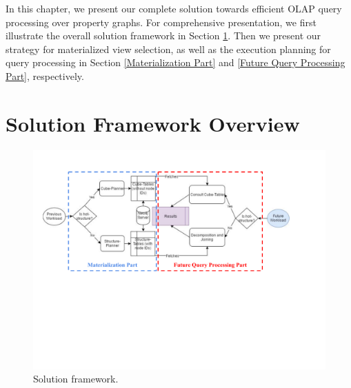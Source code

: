 
In this chapter, we present our complete solution towards efficient OLAP query processing over property graphs. For comprehensive presentation, we first illustrate the overall solution framework in Section \ref{s:4.1}. Then we present our strategy for materialized view selection, as well as the execution planning for query processing in Section \ref{Materialization Part} and \ref{Future Query Processing Part}, respectively. 



\section{Solution Framework Overview}
\label{s:4.1}

\begin{figure}[T]
	\centering
	\includegraphics[scale=0.8]{pic/41.pdf}
	\caption{Solution framework.}
	\label{Solution framework}
\end{figure}


